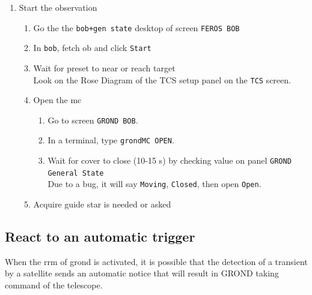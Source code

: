 \documentclass[11pt,fleqn,a4paper]{book}
\makeatletter
\def\menu#1#2{\texttt{#1}\ifx{}#2\else\@for\@x:=#2\do{$\rightarrow$\texttt{\@x}}\fi}
\def\wmenu#1#2{window menu \menu{#1}{#2}}
\makeatother
\begin{document}
\begin{enumerate}
\begin{enumerate}
\begin{enumerate}
              On the \texttt{Autoguider control} the checkbox  should be red
    \end{enumerate}
    \item Ensure the reference picking window \gls{pickrefstar} is open\\
          If necessary open it from \gls{rtd} with \wmenu{TCS}{\gls{pickrefstar}}
  \end{enumerate}
  \item Start the observation
  \begin{enumerate}
    \item Go the the \texttt{bob+gen state} \gls{desktop} of screen \texttt{FEROS BOB}
    \item In \texttt{bob}, fetch \gls{ob} and click \texttt{Start}
    \item Wait for \gls{preset} to near or reach target\\
          Look on the Rose Diagram of the \gls{TCS setup panel} on the \texttt{TCS} screen.
    \item Open the \gls{mc}
    \begin{enumerate}
      \item Go to screen \texttt{GROND BOB}.
      \item In a terminal, type \texttt{\gls{grondMC} OPEN}.
      \item Wait for cover to close (10-15 s) by checking value on panel \texttt{GROND \gls{General State}}\\
            Due to a bug, it will say \texttt{Moving}, \texttt{Closed}, then open \texttt{Open}. 
    \end{enumerate}
    \item Acquire guide star is needed or asked
  \end{enumerate}
\end{enumerate}


\subsection{React to an automatic trigger}

When the \gls{rrm} of \gls{grond} is activated, it is possible that the detection of a transient by a satellite sends an automatic notice that will result in GROND taking command of the telescope.
\end{document}
